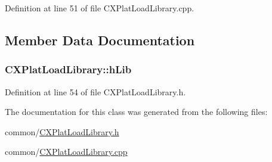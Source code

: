 \-Definition at line 51 of file \-C\-X\-Plat\-Load\-Library.\-cpp.



\subsection{\-Member \-Data \-Documentation}
\hypertarget{class_c_x_plat_load_library_abb451a48f91368a748c0c90b34d7f282}{
\subsubsection[{h\-Lib}]{ {\bf \-C\-X\-Plat\-Load\-Library\-::h\-Lib}}}\label{class_c_x_plat_load_library_abb451a48f91368a748c0c90b34d7f282}


\-Definition at line 54 of file \-C\-X\-Plat\-Load\-Library.\-h.



\-The documentation for this class was generated from the following files\-:\begin{DoxyCompactItemize}
\item 
common/\hyperlink{_c_x_plat_load_library_8h}{\-C\-X\-Plat\-Load\-Library.\-h}\item 
common/\hyperlink{_c_x_plat_load_library_8cpp}{\-C\-X\-Plat\-Load\-Library.\-cpp}\end{DoxyCompactItemize}
